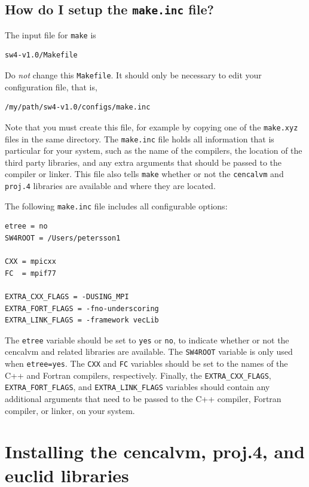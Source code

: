 \documentclass[11pt]{report}
\begin{document}
\subsection{How do I setup the {\tt make.inc} file?}

The input file for \verb+make+ is
\begin{verbatim}
sw4-v1.0/Makefile
\end{verbatim}
Do {\em not} change this \verb+Makefile+. It should only be necessary to edit your configuration
file, that is,
\begin{verbatim}
/my/path/sw4-v1.0/configs/make.inc
\end{verbatim}
Note that you must create this file, for example by copying one of the \verb+make.xyz+ files in the
same directory. The \verb+make.inc+ file holds all information that is particular for your system,
such as the name of the compilers, the location of the third party libraries, and any extra
arguments that should be passed to the compiler or linker. This file also tells \verb+make+ whether
or not the \verb+cencalvm+ and \verb+proj.4+ libraries are available and where they are located.

The following \verb+make.inc+ file includes all configurable options:
\begin{verbatim}
etree = no
SW4ROOT = /Users/petersson1

CXX = mpicxx
FC  = mpif77

EXTRA_CXX_FLAGS = -DUSING_MPI
EXTRA_FORT_FLAGS = -fno-underscoring
EXTRA_LINK_FLAGS = -framework vecLib
\end{verbatim}
The \verb+etree+ variable should be set to \verb+yes+ or \verb+no+, to indicate whether or not the
cencalvm and related libraries are available. The \verb+SW4ROOT+ variable is only used when
\verb+etree=yes+. The \verb+CXX+ and \verb+FC+ variables should be set to the names of the C++ and
Fortran compilers, respectively. Finally, the \verb+EXTRA_CXX_FLAGS+, \verb+EXTRA_FORT_FLAGS+, and
\verb+EXTRA_LINK_FLAGS+ variables should contain any additional arguments that need to be passed to
the C++ compiler, Fortran compiler, or linker, on your system.


\section{Installing the cencalvm, proj.4, and euclid libraries}\label{sec:cencalvm-install}
\end{document}

